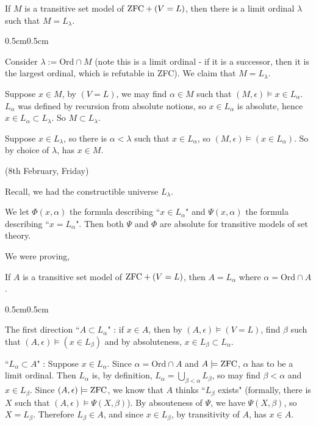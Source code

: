 \documentclass[12pt,a4paper]{article}
\newenvironment{proof}
{\begin{changemargin}{0.5cm}{0.5cm} 
	}%
	{\end{changemargin}
}
\newenvironment{p}
{\begin{proof} 
	}%
	{\end{proof}
}
\begin{document}
\lem If $M$ is a transitive set model of $\text{ZFC} + (V=L)$, then there is a limit ordinal $\lambda$ such that $M= L_{\lambda}$.
\begin{p}
\pf Consider $\lambda := \text{Ord} \cap M$ (note this is a limit ordinal - if it is a successor, then it is the largest ordinal, which is refutable in ZFC). We claim that $M = L_{\lambda}$.

\quad Suppose $x\in M$, by $(V=L)$, we may find $\alpha \in M$ such that $(M, \epsilon) \models x\in L_{\alpha}$. $L_{\alpha}$ was defined by recursion from absolute notions, so $x\in L_{\alpha}$ is absolute, hence $x\in L_{\alpha} \subset L_{\lambda}$. So $M \subset L_{\lambda}$.

\quad Suppose $x\in L_{\lambda}$, so there is $\alpha < \lambda$ such that $x\in L_{\alpha}$, so $(M, \epsilon) \models(x\in L_{\alpha})$. So by choice of $\lambda$, has $x\in M$.

\eop
\end{p}
\s

\newday

(8th February, Friday)
\s

Recall, we had the constructible universe $L_{\lambda}$.
\s

 We let $\Phi(x, \alpha)$ the formula describing ``$x\in L_{\alpha}$" and $\Psi(x,\alpha)$ the formula describing ``$x=L_{\alpha}$". Then both $\Psi$ and $\Phi$ are absolute for transitive models of set theory.
\s

We were proving,

\prop If $A$ is a transitive set model of $\text{ZFC} + (V=L)$, then $A=L_{\alpha}$ where $\alpha = \text{Ord} \cap A$.
\begin{p}
\pf The first direction ``$A\subset L_{\alpha}$" : if $x\in A$, then by $(A, \epsilon)\models (V=L)$, find $\beta$ such that $(A, \epsilon) \models (x\in L_{\beta})$ and by absoluteness, $x\in L_{\beta} \subset L_{\alpha}$.

\quad ``$L_{\alpha} \subset A$" : Suppose $x\in L_{\alpha}$. Since $\alpha =\text{Ord} \cap A$ and $A\models \text{ZFC}$, $\alpha$ has to be a limit ordinal. Then $L_{\alpha}$ is, by definition, $L_{\alpha} = \bigcup_{\beta < \alpha} L_{\beta}$, so may find $\beta < \alpha$ and $x\in L_{\beta}$. Since $(A, \epsilon) \models \text{ZFC}$, we know that $A$ thinks ``$L_{\beta}$ exists" (formally, there is $X$ such that $(A, \epsilon) \models \Psi(X, \beta)$). By absouteness of $\Psi$, we have $\Psi(X, \beta)$, so $X= L_{\beta}$. Therefore $L_{\beta} \in A$, and since $x\in L_{\beta}$, by transitivity of $A$, has $x\in A$.

\eop
\end{p}
\s
\end{document}
